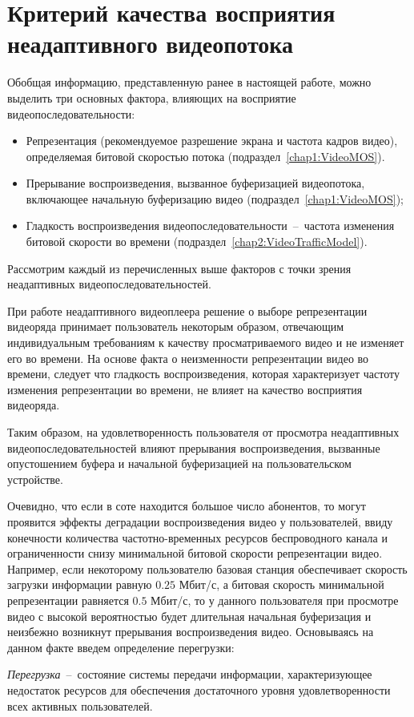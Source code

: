 \section{Критерий качества восприятия неадаптивного видеопотока}
\label{chap3:NonAdaptiveQoe}
Обобщая информацию, представленную ранее в настоящей работе, можно выделить три основных фактора, влияющих на восприятие видеопоследовательности:
\begin{itemize}
	\item Репрезентация (рекомендуемое разрешение экрана и частота кадров видео), определяемая битовой скоростью потока (подраздел~\ref{chap1:VideoMOS}).
	\item Прерывание воспроизведения, вызванное буферизацией видеопотока, включающее начальную буферизацию видео (подраздел~\ref{chap1:VideoMOS});
	\item Гладкость воспроизведения видеопоследовательности~--~частота изменения битовой скорости во времени (подраздел~\ref{chap2:VideoTrafficModel}).
\end{itemize}
Рассмотрим каждый из перечисленных выше факторов с точки зрения неадаптивных видеопоследовательностей.

При работе неадаптивного видеоплеера решение о выборе репрезентации видеоряда принимает пользователь некоторым образом, отвечающим индивидуальным требованиям к качеству просматриваемого видео и не изменяет его во времени. На основе факта о неизменности репрезентации видео во времени, следует что гладкость воспроизведения, которая характеризует частоту изменения репрезентации во времени, не влияет на качество восприятия видеоряда.

Таким образом, на удовлетворенность пользователя от просмотра неадаптивных видеопоследовательностей влияют прерывания воспроизведения, вызванные опустошением буфера и начальной буферизацией на пользовательском устройстве.

Очевидно, что если в соте находится большое число абонентов, то могут проявится эффекты деградации воспроизведения видео у пользователей, ввиду конечности количества частотно-временных ресурсов беспроводного канала и ограниченности снизу минимальной битовой скорости репрезентации видео. Например, если некоторому пользователю базовая станция обеспечивает скорость загрузки информации равную $0.25$ Мбит/с, а битовая скорость минимальной репрезентации равняется $0.5$ Мбит/с, то у данного пользователя при просмотре видео с высокой вероятностью будет длительная начальная буферизация и неизбежно возникнут прерывания воспроизведения видео. Основываясь на данном факте введем определение перегрузки:
\begin{definition}
\label{def:Congestion}
    \emph{Перегрузка}~--~состояние системы передачи информации, характеризующее недостаток ресурсов для обеспечения достаточного уровня удовлетворенности всех активных пользователей.
\end{definition}

